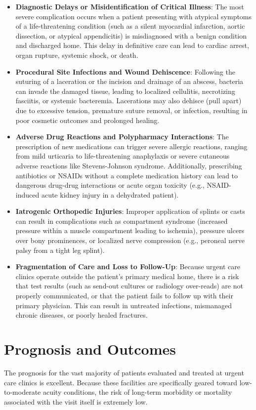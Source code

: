 \begin{itemize}
  \item \textbf{Diagnostic Delays or Misidentification of Critical Illness}: The most severe complication occurs when a patient presenting with atypical symptoms of a life-threatening condition (such as a silent myocardial infarction, aortic dissection, or atypical appendicitis) is misdiagnosed with a benign condition and discharged home. This delay in definitive care can lead to cardiac arrest, organ rupture, systemic shock, or death.
  \item \textbf{Procedural Site Infections and Wound Dehiscence}: Following the suturing of a laceration or the incision and drainage of an abscess, bacteria can invade the damaged tissue, leading to localized cellulitis, necrotizing fasciitis, or systemic bacteremia. Lacerations may also dehisce (pull apart) due to excessive tension, premature suture removal, or infection, resulting in poor cosmetic outcomes and prolonged healing.
  \item \textbf{Adverse Drug Reactions and Polypharmacy Interactions}: The prescription of new medications can trigger severe allergic reactions, ranging from mild urticaria to life-threatening anaphylaxis or severe cutaneous adverse reactions like Stevens-Johnson syndrome. Additionally, prescribing antibiotics or NSAIDs without a complete medication history can lead to dangerous drug-drug interactions or acute organ toxicity (e.g., NSAID-induced acute kidney injury in a dehydrated patient).
  \item \textbf{Iatrogenic Orthopedic Injuries}: Improper application of splints or casts can result in complications such as compartment syndrome (increased pressure within a muscle compartment leading to ischemia), pressure ulcers over bony prominences, or localized nerve compression (e.g., peroneal nerve palsy from a tight leg splint).
  \item \textbf{Fragmentation of Care and Loss to Follow-Up}: Because urgent care clinics operate outside the patient's primary medical home, there is a risk that test results (such as send-out cultures or radiology over-reads) are not properly communicated, or that the patient fails to follow up with their primary physician. This can result in untreated infections, mismanaged chronic diseases, or poorly healed fractures.
\end{itemize}

\section*{Prognosis and Outcomes}
The prognosis for the vast majority of patients evaluated and treated at urgent care clinics is excellent. Because these facilities are specifically geared toward low-to-moderate acuity conditions, the risk of long-term morbidity or mortality associated with the visit itself is extremely low.


